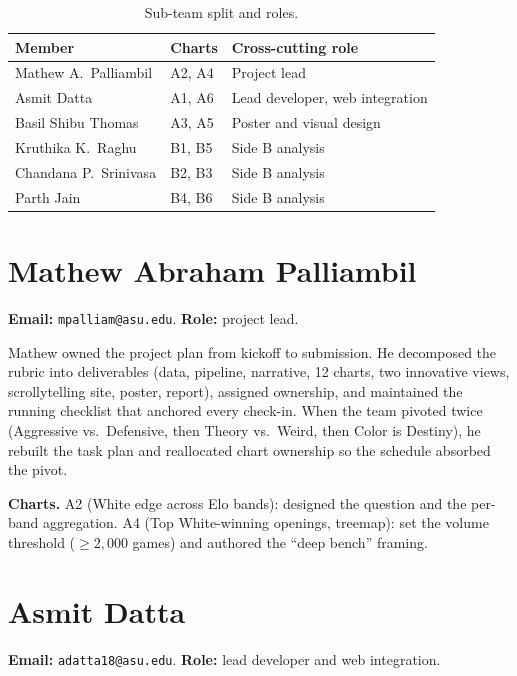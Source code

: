 \documentclass[sigconf,nonacm,natbib=false]{acmart}
\begin{document}
\begin{table}[h]
\centering
\small
\begin{tabular}{@{}lll@{}}
\toprule
\textbf{Member} & \textbf{Charts} & \textbf{Cross-cutting role} \\
\midrule
Mathew A.\ Palliambil  & A2, A4 & Project lead \\
Asmit Datta            & A1, A6 & Lead developer, web integration \\
Basil Shibu Thomas     & A3, A5 & Poster and visual design \\
Kruthika K.\ Raghu     & B1, B5 & Side B analysis \\
Chandana P.\ Srinivasa & B2, B3 & Side B analysis \\
Parth Jain             & B4, B6 & Side B analysis \\
\bottomrule
\end{tabular}
\caption{Sub-team split and roles.}
\label{tab:roles}
\end{table}

\section{Mathew Abraham Palliambil}
\textbf{Email:} \texttt{mpalliam@asu.edu}.
\textbf{Role:} project lead.

Mathew owned the project plan from kickoff to submission. He
decomposed the rubric into deliverables (data, pipeline, narrative,
12 charts, two innovative views, scrollytelling site, poster,
report), assigned ownership, and maintained the running checklist
that anchored every check-in. When the team pivoted twice
(Aggressive vs.\ Defensive, then Theory vs.\ Weird, then Color is
Destiny), he rebuilt the task plan and reallocated chart ownership
so the schedule absorbed the pivot.

\textbf{Charts.}
A2 (White edge across Elo bands): designed the question and the
per-band aggregation.
A4 (Top White-winning openings, treemap): set the volume threshold
($\geq 2{,}000$ games) and authored the ``deep bench'' framing.

\section{Asmit Datta}
\textbf{Email:} \texttt{adatta18@asu.edu}.
\textbf{Role:} lead developer and web integration.
\end{document}
